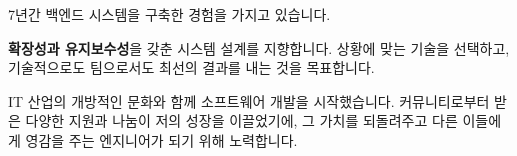 

\begin{cvparagraph}

7년간 백엔드 시스템을 구축한 경험을 가지고 있습니다.

\textbf{확장성과 유지보수성}을 갖춘 시스템 설계를 지향합니다. 상황에 맞는 기술을 선택하고, 기술적으로도 팀으로서도 최선의 결과를 내는 것을 목표합니다.

IT 산업의 개방적인 문화와 함께 소프트웨어 개발을 시작했습니다.  커뮤니티로부터 받은 다양한 지원과 나눔이 저의 성장을 이끌었기에, 그 가치를 되돌려주고 다른 이들에게 영감을 주는 엔지니어가 되기 위해 노력합니다.

\end{cvparagraph}
